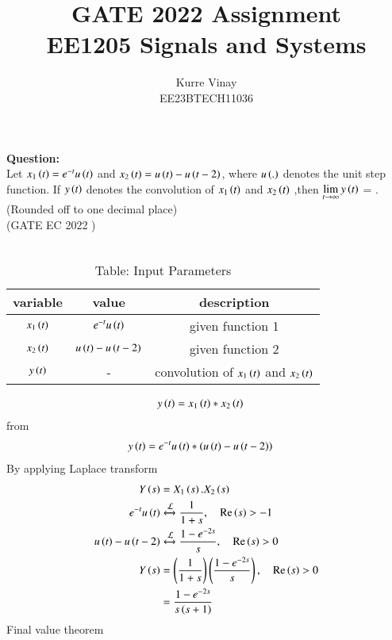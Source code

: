 \documentclass[a4,12pt,onecolumn]{IEEEtran}
\begin{document}
\title{
\Huge\textbf{ GATE 2022 Assignment}\\
\Huge\textbf{EE1205} Signals and Systems\\
}
\large\author{Kurre Vinay\\EE23BTECH11036}
\maketitle
\textbf{Question:}\\
Let $x_1\left(t\right) = e^{-t}u\left(t\right)$ and $x_2\left(t\right) =u\left(t\right)-u\left(t-2\right)$, where $u\left(.\right)$ denotes the unit step function. If $y\left(t\right)$ denotes the convolution of $x_1\left(t\right)$ and $x_2\left(t\right)$ ,then $\lim\limits_{t \to \infty} y\left(t\right)$ = \underline{\hspace{1cm}}. (Rounded off to one decimal place)\\
\hfill(GATE EC 2022 )\\
\solution\\
\begin{table}[ht!]
\begin{center}
\label{table1:example}
\begin{tabular}{|c|c|c|}
   \hline
   variable&value&description\\
   \hline
   $x_1\left(t\right)$& $e^{-t}u\left(t\right)$&given function 1\\
   \hline
   $x_2\left(t\right)$&$u\left(t\right)-u\left(t-2\right)$&given function 2\\
    \hline
    $y\left(t\right)$&-& convolution of $x_1\left(t\right)$ and $x_2\left(t\right)$\\
    \hline
\end{tabular}
\caption{Table: Input Parameters}
\label{tab:1}
\end{center}
\end{table}
\begin{align}
y\left(t\right) &= x_1\left(t\right)*x_2\left(t\right)
\end{align}
from 
\begin{align}
y\left(t\right) &= e^{-t}u\left(t\right)*\left(u\left(t\right)-u\left(t-2\right)\right)
\end{align}
By applying Laplace transform
\begin{align}
Y\left(s\right)&=X_1\left(s\right).X_2\left(s\right)\\
e^{-t}u\left(t\right)&\xleftrightarrow{\mathcal{L}}\frac{1}{1+s} , \quad{ \text{Re}\ensuremath{\left(s\right)}>-1}\\
u\left(t\right)-u\left(t-2\right)&\xleftrightarrow{\mathcal{L}}\frac{1-e^{-2s}}{s} ,\quad{\text{Re}\ensuremath{\left(s\right)} > 0}\\
Y\left(s\right)&=\left(\frac{1}{1+s}\right)\left(\frac{1-e^{-2s}}{s}\right),\quad{\text{Re}\ensuremath{\left(s\right)} > 0}\\
&=\frac{1-e^{-2s}}{s\left(s+1\right)}
\end{align}
 Final value theorem
\end{document}
